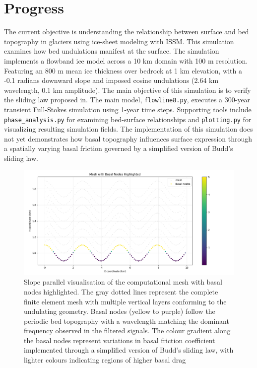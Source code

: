 \chapter{Progress}

The current objective is understanding the relationship between surface and bed topography in glaciers using ice-sheet modeling with ISSM. This simulation examines how bed undulations manifest at the surface. The simulation implements a flowband ice model across a 10 km domain with 100 m resolution. Featuring an 800 m mean ice thickness over bedrock at 1 km elevation, with a -0.1 radians downward slope and imposed cosine undulations (2.64 km wavelength, 0.1 km amplitude). The main objective of this simulation is to verify the sliding law proposed in\cite{Budd_1970}. The main model, \texttt{flowline8.py}, executes a 300-year transient Full-Stokes simulation using 1-year time steps. Supporting tools include \texttt{phase\_analysis.py} for examining bed-surface relationships and \texttt{plotting.py} for visualizing resulting simulation fields. The implementation of this simulation does not yet demonstrates how basal topography influences surface expression through a spatially varying basal friction governed by a simplified version of Budd's sliding law.

\begin{figure}[H]
    \includegraphics[scale=0.5]{basal_friction.png}
    \caption{Slope parallel visualisation of the computational mesh with basal nodes highlighted. The gray dotted lines represent the complete finite element mesh with multiple vertical layers conforming to the undulating geometry. Basal nodes (yellow to purple) follow the periodic bed topography with a wavelength matching the dominant frequency observed in the filtered signals. The colour gradient along the basal nodes represent variations in basal friction coefficient implemented through a simplified version of Budd's sliding law, with lighter colours indicating regions of higher basal drag}
    \label{fig:Friction}
\end{figure}

